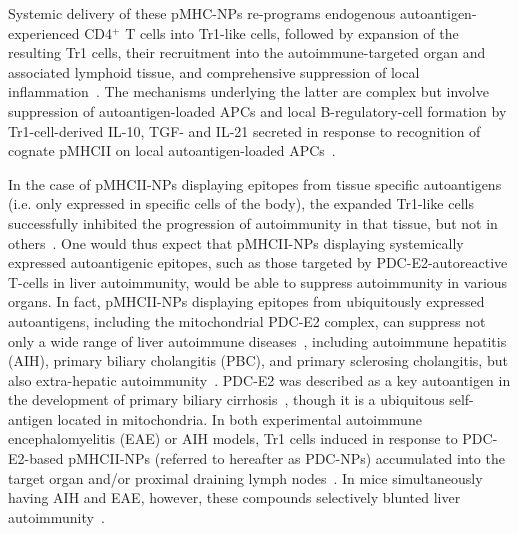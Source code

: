 
Systemic delivery of these pMHC-NPs re-programs endogenous autoantigen-experienced CD4$^+$ T cells into Tr1-like cells, followed by expansion of the resulting Tr1 cells, their recruitment into the autoimmune-targeted organ and associated lymphoid tissue, and comprehensive suppression of local inflammation~\cite{Tr1paper,serra2015nanoparticle,singha2017peptide,umeshappa2019suppression,umeshappa2020ubiquitous}. The mechanisms underlying the latter are complex but involve suppression of autoantigen-loaded APCs and local B-regulatory-cell formation by Tr1-cell-derived IL-10, TGF-\textbeta{} and IL-21 secreted in response to recognition of cognate pMHCII on local autoantigen-loaded APCs~\cite{Tr1paper}. %

In the case of pMHCII-NPs displaying epitopes from tissue specific autoantigens (i.e. only expressed in specific cells of the body), the expanded Tr1-like cells successfully inhibited the progression of autoimmunity in that tissue, but not in others~\cite{wraith2016antigen,Tr1paper,bayry2016repressing}. One would thus expect that pMHCII-NPs displaying systemically expressed autoantigenic epitopes, such as those targeted by PDC-E2-autoreactive T-cells in liver autoimmunity, would be able to suppress autoimmunity in various organs. In fact, pMHCII-NPs displaying epitopes from ubiquitously expressed autoantigens, including the mitochondrial PDC-E2 complex, can suppress not only a wide range of liver autoimmune diseases~\cite{umeshappa2019suppression}, including autoimmune hepatitis (AIH), primary biliary cholangitis (PBC), and primary sclerosing cholangitis, but also extra-hepatic autoimmunity~\cite{umeshappa2020ubiquitous}. PDC-E2 was described as a key autoantigen in the development of primary biliary cirrhosis~\cite{yeaman1996pyruvate}, though it is a ubiquitous self-antigen located in mitochondria. In both experimental autoimmune encephalomyelitis (EAE) or AIH models, Tr1 cells induced in response to PDC-E2-based pMHCII-NPs (referred to hereafter as PDC-NPs) accumulated into the target organ and/or proximal draining lymph nodes~\cite{umeshappa2019suppression,umeshappa2020ubiquitous}. In mice simultaneously having AIH and EAE, however, these compounds selectively blunted liver autoimmunity~\cite{umeshappa2020ubiquitous}.

